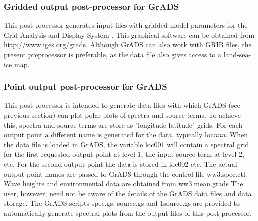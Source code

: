\pb
\vsssub
\subsubsection{Gridded output post-processor for GrADS} \label{sec:post_gf}
\vsssub



\vspace{\baselineskip} 
\noindent 
This post-processor generates input files with gridded model parameters for
the Grid Analysis and Display System \citep[GrADS,][]{man:GrADS}. This
graphical software can be obtained from http://www.iges.org/grads. Although
GrADS can also work with GRIB files, the present preprocessor is preferable,
as the data file also gives access to a land-sea-ice map.


\pb
\vsssub
\subsubsection{Point output post-processor for GrADS} \label{sec:post_gp}
\vsssub



\vspace{\baselineskip} 
\noindent
This post-processor is intended to generate data files with which GrADS (see
previous section) can plot polar plots of spectra and source terms. To achieve
this, spectra and source terms are store as "longitude-latitude" grids. For
each output point a different name is generated for the data, typically {\F
loc{\it nnn}}. When the data file is loaded in GrADS, the variable {\F loc001}
will contain a spectral grid for the first requested output point at level 1,
the input source term at level 2, etc. For the second output point the data is
stored in {\F loc002} etc. The actual output point names are passed to GrADS
through the control file {\file ww3.spec.ctl}. Wave heights and environmental
data are obtained from {\file ww3.mean.grads} The user, however, need not be
aware of the details of the GrADS data files and data storage. The GrADS
scripts {\file spec.gs}, {\file source.gs} and {\file 1source.gs} are provided
to automatically generate spectral plots from the output files of this
post-processor.

